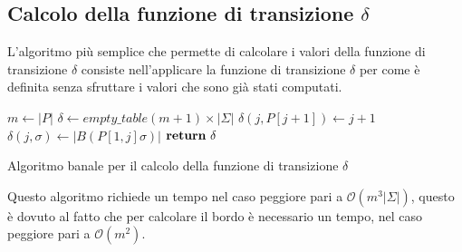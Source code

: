 \subsection{Calcolo della funzione di transizione $\delta$}
L'algoritmo più semplice che permette di calcolare i valori della funzione di transizione $\delta$ consiste nell’applicare la funzione di transizione $\delta$ per come è definita senza sfruttare i valori che sono già stati computati.
\begin{algorithm}
  \begin{algorithmic}
    \State $m\gets |P|$
    \State $\delta \gets empty\_table (m + 1) \times | \Sigma|$
        \State $\delta(j, P[j + 1]) \gets j + 1$
    \EndFor
        \For{$\sigma \in \Sigma$}
            \State $\delta(j, \sigma) \gets |B(P[1, j]\sigma)|$
        \EndFor
    \EndFor
    \State $\text{\textbf{return}} \ \delta$
    \EndFunction
  \end{algorithmic}
  \caption{Algoritmo banale per il calcolo della funzione di transizione $\delta$}
\end{algorithm}
Questo algoritmo richiede un tempo nel caso peggiore pari a $\mathcal{O}(m^3 | \Sigma|)$, questo è dovuto al fatto che per calcolare il bordo è necessario un tempo, nel caso peggiore pari a $\mathcal{O}(m^2)$.

